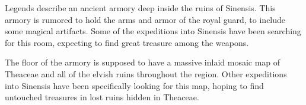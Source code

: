 Legends describe an ancient armory deep inside the ruins of Sinensis.
This armory is rumored to hold the arms and armor of the royal guard, to include some magical artifacts.
Some of the expeditions into Sinensis have been searching for this room, expecting to find great treasure among the weapons.

The floor of the armory is supposed to have a massive inlaid mosaic map of Theaceae and all of the elvish ruins throughout the region.
Other expeditions into Sinensis have been specifically looking for this map, hoping to find untouched treasures in lost ruins hidden in Theaceae.
